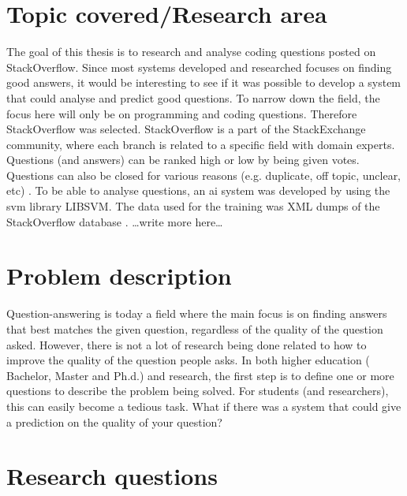 \label{chap:introduction}

\section{Topic covered/Research area}
\label{sec:topic_covered}
The goal of this thesis is to research and analyse coding questions posted on StackOverflow. Since most systems developed and researched focuses on finding good answers, 
it would be interesting to see if it was possible to develop a system that could analyse and predict good questions. To narrow down the field, the focus here will only 
be on programming and coding questions. Therefore StackOverflow was selected. StackOverflow is a part of the StackExchange community, where each branch is related to 
a specific field with domain experts. Questions (and answers) can be ranked high or low by being given votes. Questions can also be closed for various reasons (e.g. 
duplicate, off topic, unclear, etc) \cite{Stackoverflow.com2016a}. 
\newline
To be able to analyse questions, an \gls{ai} system was developed by using the \gls{svm} library LIBSVM. The data used for the training was XML dumps of the StackOverflow 
database \cite{StackExchange2016}.
\newline
\ldots write more here\ldots

\section{Problem description}
\label{sec:problem_description}
Question-answering is today a field where the main focus is on finding answers that best matches the given question, regardless of the quality of the question asked. 
However, there is not a lot of research being done related to how to improve the quality of the question people asks. In both higher education ( Bachelor, Master and Ph.d.) 
and research, the first step is to define one or more questions to describe the problem being solved. For students (and researchers), this can easily become a tedious task. 
What if there was a system that could give a prediction on the quality of your question?

\section{Research questions}
\label{sec:research_questions}

